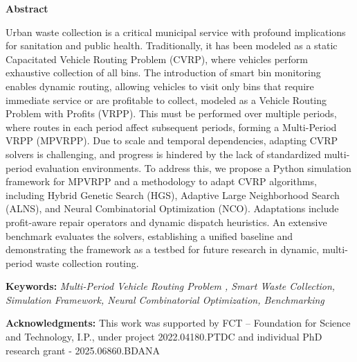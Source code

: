 \documentclass[9pt,a4paper]{book}
\newenvironment{emptyStruct}{}{}
\newenvironment{keyw}{%
	\textbf{Keywords:}\begin{emptyStruct}}{%
\end{emptyStruct}}
\newcommand{\paperKeywords}[1]{%
    \bigskip
	\nopagebreak\noindent
	\begin{keyw}
		\normalsize \emph{#1}
	\end{keyw}
	\bigskip
}%
\newcommand{\paperRef}[1]{
\item #1
}
\newcommand{\paperReferences}[1]{%
\par\noindent\textbf{References}
\renewcommand{\theenumi}{[\arabic{enumi}]}
\renewcommand{\labelenumi}{\theenumi}
\begin{enumerate}[noitemsep,topsep=0pt]
	#1
\end{enumerate}

}%
\newcommand{\paperAcknowledgments}[1]{%
	\vfill
	\par\noindent\textbf{Acknowledgments:}
	\normalsize #1
}%
\begin{document}
\medskip
\begin{center}
    \textbf{Abstract}
\end{center}
{%
Urban waste collection is a critical municipal service with profound implications for sanitation and public health. Traditionally, it has been modeled as a static Capacitated Vehicle Routing Problem (CVRP), where vehicles perform exhaustive collection of all bins. The introduction of smart bin monitoring enables dynamic routing, allowing vehicles to visit only bins that require immediate service or are profitable to collect, modeled as a Vehicle Routing Problem with Profits (VRPP). This must be performed over multiple periods, where routes in each period affect subsequent periods, forming a Multi-Period VRPP (MPVRPP). Due to scale and temporal dependencies, adapting CVRP solvers is challenging, and progress is hindered by the lack of standardized multi-period evaluation environments. To address this, we propose a Python simulation framework for MPVRPP and a methodology to adapt CVRP algorithms, including Hybrid Genetic Search (HGS), Adaptive Large Neighborhood Search (ALNS), and Neural Combinatorial Optimization (NCO). Adaptations include profit-aware repair operators and dynamic dispatch heuristics. An extensive benchmark evaluates the solvers, establishing a unified baseline and demonstrating the framework as a testbed for future research in dynamic, multi-period waste collection routing.






}%


\paperKeywords{Multi-Period Vehicle Routing Problem ,
Smart Waste Collection,
Simulation Framework,
Neural Combinatorial Optimization,
Benchmarking }%





\paperAcknowledgments{This work was supported by FCT – Foundation for Science and Technology, I.P., under project 2022.04180.PTDC and individual PhD research grant - 2025.06860.BDANA}%

\end{document}
